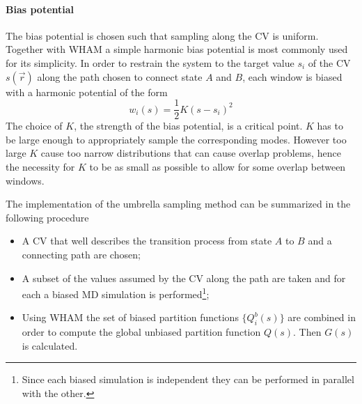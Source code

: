 \paragraph{\textbf{Bias potential}} The bias potential is chosen such that sampling along the \ac{CV} is uniform. 
Together with \ac{WHAM} a simple harmonic bias potential is most commonly used for its simplicity. In order to 
restrain the system to the target value $s_i$ of the \ac{CV} $s(\vec r)$ along the path chosen to connect state 
$A$ and $B$, each window is biased with a harmonic potential of the form
\begin{equation*}
	w_i(s) = \frac{1}{2}K (s - s_i)^2
\end{equation*}
The choice of $K$, the strength of the bias potential, is a critical point. $K$ has to be large enough to 
appropriately sample the corresponding modes. However too large $K$ cause too narrow distributions that can cause 
overlap problems, hence the necessity for $K$ to be as small as possible to allow for some overlap between 
windows.


\bigskip The implementation of the umbrella sampling method can be summarized in the following procedure
\begin{itemize}
	\item A \ac{CV} that well describes the transition process from state $A$ to $B$ and a connecting path are chosen;
	\item A subset of the values assumed by the \ac{CV} along the path are taken and for each a biased \ac{MD} simulation is performed\footnote{Since each biased simulation is independent they can be performed in parallel with the other.};
	\item Using \ac{WHAM} the set of biased partition functions $\{Q^b_i(s)\}$ are combined in order to compute the global unbiased partition function $Q(s)$. Then $G(s)$ is calculated.
\end{itemize}

 
